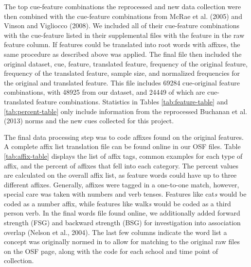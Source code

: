 \documentclass[english,man]{apa6}
\theoremstyle{definition}
\theoremstyle{definition}
\theoremstyle{definition}
\theoremstyle{remark}
\begin{document}
The top cue-feature combinations the reprocessed and new data collection
were then combined with the cue-feature combinations from McRae et al.
(2005) and Vinson and Vigliocco (2008). We included all of their
cue-feature combinations with the cue-feature listed in their
supplemental files with the feature in the raw feature column. If
features could be translated into root words with affixes, the same
procedure as described above was applied. The final file then included
the original dataset, cue, feature, translated feature, frequency of the
original feature, frequency of the translated feature, sample size, and
normalized frequencies for the original and translated feature. This
file includes 69284 cue-original feature combinations, with 48925 from
our dataset, and 24449 of which are cue-translated feature combinations.
Statistics in Tables \ref{tab:feature-table} and \ref{tab:percent-table}
only include information from the reprocessed Buchanan et al. (2013)
norms and the new cues collected for this project.

The final data processing step was to code affixes found on the original
features. A complete affix list translation file can be found online in
our OSF files. Table \ref{tab:affix-table} displays the list of affix
tags, common examples for each type of affix, and the percent of affixes
that fell into each category. The percent values are calculated on the
overall affix list, as feature words could have up to three different
affixes. Generally, affixes were tagged in a one-to-one match, however,
special care was taken with numbers and verb tenses. Features like
cat\emph{s} would be coded as a number affix, while features like
walk\emph{s} would be coded as a third person verb. In the final words
file found online, we additionally added forward strength (FSG) and
backward strength (BSG) for investigation into association overlap
(Nelson et al., 2004). The last few columns indicate the word list a
concept was originally normed in to allow for matching to the original
raw files on the OSF page, along with the code for each school and time
point of collection.
\end{document}
